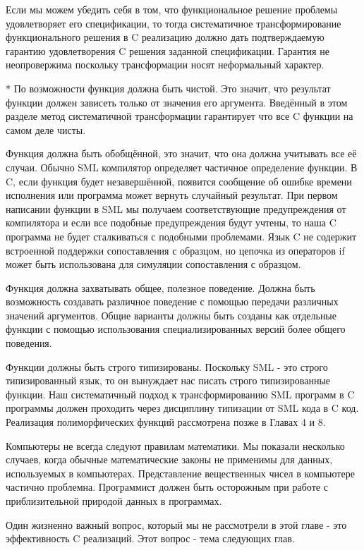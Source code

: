 Если мы можем убедить себя в том, что функциональное решение проблемы удовлетворяет его спецификации, то тогда систематичное трансформирование функционального решения в C реализацию должно дать подтверждаемую гарантию удовлетворения C решения заданной спецификации. Гарантия не неопровержима поскольку трансформации носят неформальный характер.

* По возможности функция должна быть чистой. Это значит, что результат функции должен зависеть только от значения его аргумента. Введённый в этом разделе метод систематичной трансформации гарантирует что все C функции на самом деле чисты.

Функция должна быть обобщённой, это значит, что она должна учитывать все её случаи. Обычно SML компилятор определяет частичное определение функции. В C, если функция будет незавершённой, появится сообщение об ошибке времени исполнения или программа может вернуть случайный результат. При первом написании функции в SML мы получаем соответствующие предупреждения от компилятора и если все подобные предупреждения будут учтены, то наша C программа не будет сталкиваться с подобными проблемами. Язык C не содержит встроенной поддержки сопоставления с образцом, но цепочка из операторов if может быть использована для симуляции сопоставления с образцом.

Функция должна захватывать общее, полезное поведение. Должна быть возможность создавать различное поведение с помощью передачи различных значений аргументов. Общие варианты должны быть созданы как отдельные функции с помощью использования специализированных версий более общего поведения.

Функции должны быть строго типизированы. Поскольку SML - это строго типизированный язык, то он вынуждает нас писать строго типизированные функции. Наш систематичный подход к трансформированию SML программ в C программы должен проходить через дисциплину типизации от SML кода в C код. Реализация полиморфических функций рассмотрена позже в Главах 4 и 8.

Компьютеры не всегда следуют правилам математики. Мы показали несколько случаев, когда обычные математические законы не применимы для данных, используемых в компьютерах. Представление вещественных чисел в компьютере частично проблемна. Программист должен быть осторожным при работе с приблизительной природой данных в программах.

Один жизненно важный вопрос, который мы не рассмотрели в этой главе - это эффективность C реализаций. Этот вопрос - тема следующих глав.

